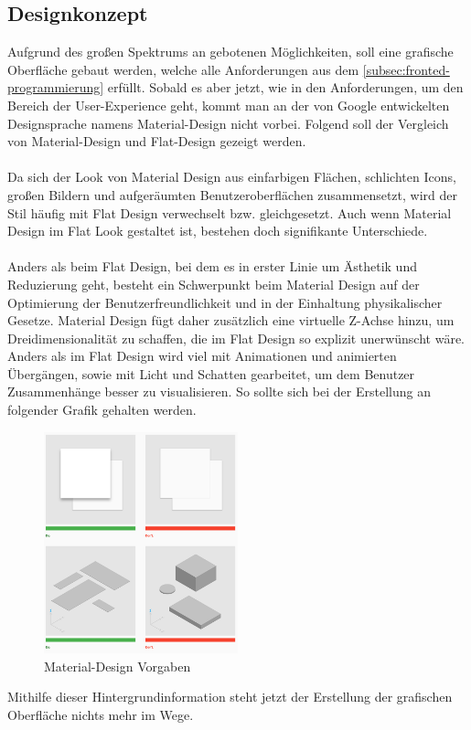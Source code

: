 \subsection{Designkonzept}
Aufgrund des großen Spektrums an gebotenen Möglichkeiten, soll eine grafische Oberfläche gebaut werden, welche alle Anforderungen aus dem \autoref{subsec:fronted-programmierung} erfüllt.
Sobald es aber jetzt, wie in den Anforderungen, um den Bereich der User-Experience geht, kommt man an der von Google entwickelten Designsprache namens Material-Design nicht vorbei.
Folgend soll der Vergleich von Material-Design und Flat-Design gezeigt werden.\\\\
Da sich der Look von Material Design aus einfarbigen Flächen, schlichten Icons, großen Bildern und aufgeräumten Benutzeroberflächen zusammensetzt, wird der Stil häufig mit Flat Design verwechselt bzw. gleichgesetzt. Auch wenn Material Design im Flat Look gestaltet ist, bestehen doch signifikante Unterschiede.\\\\
Anders als beim Flat Design, bei dem es in erster Linie um Ästhetik und Reduzierung geht, besteht ein Schwerpunkt beim Material Design auf der Optimierung der Benutzerfreundlichkeit und in der Einhaltung physikalischer Gesetze.
Material Design fügt daher zusätzlich eine virtuelle Z-Achse hinzu, um Dreidimensionalität zu schaffen, die im Flat Design so explizit unerwünscht wäre.
Anders als im Flat Design wird viel mit Animationen und animierten Übergängen, sowie mit Licht und Schatten gearbeitet, um dem Benutzer Zusammenhänge besser zu visualisieren.
So sollte sich bei der Erstellung an folgender Grafik gehalten werden.
\begin{figure}[H]
\centering
\includegraphics[width=0.5\textwidth]{fig/ainf/material-design-rules.png}
\caption{Material-Design Vorgaben}
\label{rpiAndDisplay}
\end{figure}
Mithilfe dieser Hintergrundinformation steht jetzt der Erstellung der grafischen Oberfläche nichts mehr im Wege.
